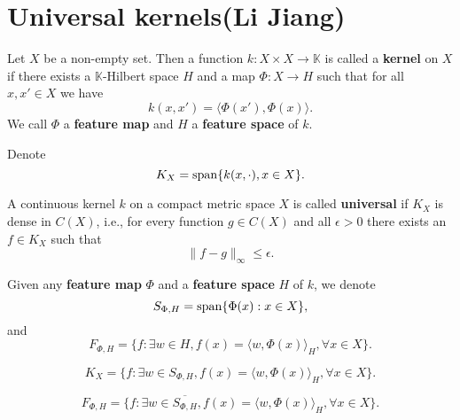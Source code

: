 \section{Universal kernels(Li Jiang)}

\begin{definition}
	Let $X$ be a non-empty set. Then  a function $k:X\times X \rightarrow \mathbb{K}$ is called a \textbf{kernel} on $X$ if there exists a $\mathbb{K}$-Hilbert space $H$ and a map $\Phi:X\rightarrow H$ such that for all $x,x' \in X$ we have
	\begin{equation}
	k(x,x') = \langle \Phi(x'),\Phi(x) \rangle.
	\end{equation}
	We call $\Phi$ a \textbf{feature map} and $H$ a \textbf{feature space} of $k$.
\end{definition}

Denote
\begin{equation}
K_X = {\rm span} \{k(x,\cdot), x\in X\}.
\end{equation}

\begin{definition}
	A continuous kernel $k$ on a compact metric space $X$ is called \textbf{universal} if $K_X$ is dense in $C(X)$, i.e., for every function $g\in C(X)$ and all $\epsilon>0$ there exists an $f\in K_X$ such that
	\begin{equation}
	\|f-g\|_{\infty} \leq \epsilon.
	\end{equation} 
\end{definition}

Given any \textbf{feature map} $\Phi$ and  a \textbf{feature space} $H$ of $k$, we denote
\begin{equation}
S_{\Phi,H} = {\rm span} \{\Phi(x): x\in X\},
\end{equation}
and
\begin{equation}
F_{\Phi,H} = \{f:  \exists w\in H, f(x) = \langle w, \Phi(x) \rangle_H, \forall x\in X\}.
\end{equation}

\begin{lemma}
	\begin{equation}
		K_X = \{f:  \exists w\in S_{\Phi,H}, f(x) = \langle w, \Phi(x) \rangle_H, \forall x\in X\}.
	\end{equation}
\end{lemma}

\begin{lemma}
	\begin{equation}
	F_{\Phi,H} = \{f:  \exists w\in \overline{S_{\Phi,H}}, f(x) = \langle w, \Phi(x) \rangle_H, \forall x\in X\}.
	\end{equation}
\end{lemma}

